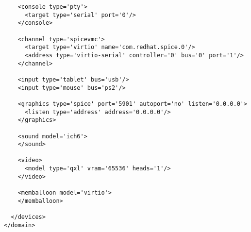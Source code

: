 \documentclass[spanisheDIVcalc,twoside,parskip-,pointlessnumbers,final]{scrbook}
\newcommand{\clearemptydoublepage}{\newpage{\pagestyle{empty}\cleardoublepage}}
\begin{document}
\begin{lstlisting}
    <console type='pty'>
      <target type='serial' port='0'/>
    </console>

    <channel type='spicevmc'>
      <target type='virtio' name='com.redhat.spice.0'/>
      <address type='virtio-serial' controller='0' bus='0' port='1'/>
    </channel>

    <input type='tablet' bus='usb'/>
    <input type='mouse' bus='ps2'/>

    <graphics type='spice' port='5901' autoport='no' listen='0.0.0.0'>
      <listen type='address' address='0.0.0.0'/>
    </graphics>

    <sound model='ich6'>
    </sound>

    <video>
      <model type='qxl' vram='65536' heads='1'/>
    </video>

    <memballoon model='virtio'>
    </memballoon>

  </devices>
</domain>
\end{lstlisting}
\backmatter

\nocite{KVMBestPractices}
\nocite{Creasy:1981:OVT:1664853.1664863}
\nocite{IBMVirt}
\nocite{RiseType0}
\nocite{Adams:2006:CSH:1168917.1168860}
\nocite{VirtOverview}
\nocite{HWSupport}
\nocite{EPT}
\nocite{RVI}
\nocite{Overcommiting}
\nocite{KVMTunning}
\nocite{KVMSecurity}
\nocite{SpiceNewbies}
\nocite{VDIfaces}
\nocite{Libvirt}
\clearemptydoublepage


\end{document}
